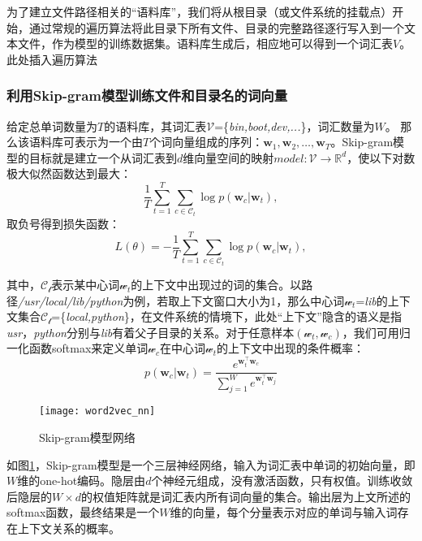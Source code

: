 为了建立文件路径相关的“语料库”，我们将从根目录（或文件系统的挂载点）开始，通过常规的遍历算法将此目录下所有文件、目录的完整路径逐行写入到一个文本文件，作为模型的训练数据集。语料库生成后，相应地可以得到一个词汇表$V$。
{\color{red}此处插入遍历算法}

\subsubsection*{利用Skip-gram模型训练文件和目录名的词向量}
给定总单词数量为$T$的语料库，其词汇表$\mathcal{V}$=\{\textit{bin,boot,dev,...}\}，词汇数量为$W$。
那么该语料库可表示为一个由$T$个词向量组成的序列：$\mathbf{w}_1, \mathbf{w}_2, \dots, \mathbf{w}_T$。Skip-gram模型的目标就是建立一个从词汇表到$d$维向量空间的映射$model:\mathcal{V} \rightarrow \mathbb{R}^d$，使以下对数极大似然函数达到最大：
\begin{equation}
    \label{eq:origin_object}
    \frac{1}{T}\sum_{t=1}^T \sum_{c \in \mathcal{C}_t} \log p(\mathbf{w}_c | \mathbf{w}_t),
\end{equation}
取负号得到损失函数：
\begin{equation}
    L(\theta)= -\frac{1}{T}\sum_{t=1}^T \sum_{c \in \mathcal{C}_t} \log p(\mathbf{w}_c | \mathbf{w}_t),
\end{equation}

其中，$\mathcal{C_t}$表示某中心词$\mathcal{w}_t$的上下文中出现过的词的集合。以路径\textit{/usr/local/lib/python}为例，若取上下文窗口大小为1，那么中心词$\mathcal{w}_t$=\textit{lib}的上下文集合$\mathcal{C_t}$=\{\textit{local,python}\}，在文件系统的情境下，此处“上下文”隐含的语义是指\textit{usr}，\textit{python}分别与\textit{lib}有着父子目录的关系。对于任意样本$(\mathbf{\mathcal{w}}_t,\mathbf{\mathcal{w}}_c)$，我们可用归一化函数softmax来定义单词$\mathcal{w}_c$在中心词$\mathbf{\mathcal{w}}_t$的上下文中出现的条件概率：
\begin{equation}
    \label{eq:softmax}
    p(\mathbf{w}_c | \mathbf{w}_t)=\frac{ e^{ \mathbf{w}_t^{\top} \mathbf{w}_c} }{ \sum_{j=1}^W e^{\mathbf{w}_t^{\top} \mathbf{w}_j}} 
\end{equation}

\begin{figure}[htp]
\centering
\texttt{[image: word2vec\_nn]}
\caption{Skip-gram模型网络}
\label{fig:word2vec_nn}
\end{figure}
如图\ref{fig:word2vec_nn}，Skip-gram模型是一个三层神经网络，输入为词汇表中单词的初始向量，即$W$维的one-hot编码。隐层由$d$个神经元组成，没有激活函数，只有权值。训练收敛后隐层的$W\times d$的权值矩阵就是词汇表内所有词向量的集合。输出层为上文所述的softmax函数，最终结果是一个$W$维的向量，每个分量表示对应的单词与输入词存在上下文关系的概率。

